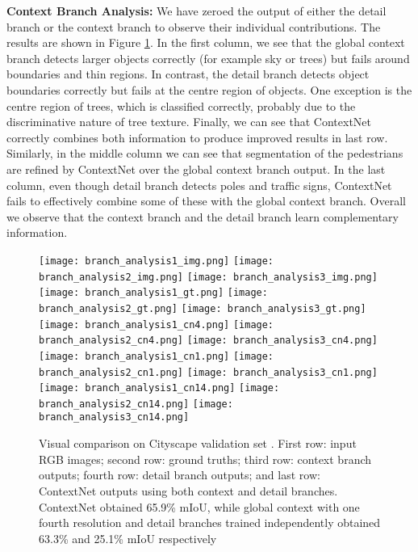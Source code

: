 \documentclass[runningheads]{llncs}
\newcommand{\subsubsubsection}[1]{\vspace{0.2em}\noindent\textbf{\textcolor[rgb]{0,.1,.4}{#1:}}}
\begin{document}
\subsubsubsection{Context Branch Analysis}
We have zeroed the output of either the detail branch or the context branch to observe their individual contributions. The results are shown in Figure \ref{fig:results-cityscapes-viz}. In the first column, we see that the global context branch detects larger objects correctly (for example sky or trees) but fails around boundaries and thin regions. In contrast, the detail branch detects object boundaries correctly but fails at the centre region of objects. One exception is the centre region of trees, which is classified correctly, probably due to the discriminative nature of tree texture. Finally, we can see that ContextNet correctly combines both information to produce improved results in last row. Similarly, in the middle column we can see that segmentation of the pedestrians are refined by ContextNet over the global context branch output. In the last column, even though detail branch detects poles and traffic signs, ContextNet fails to effectively combine some of these with the global context branch. Overall we observe that the context branch and the detail branch learn complementary information.

\begin{figure}[t!]
\begin{center}
    \texttt{[image: branch\_analysis1\_img.png]}
    \texttt{[image: branch\_analysis2\_img.png]}
    \texttt{[image: branch\_analysis3\_img.png]}
    \\
    \texttt{[image: branch\_analysis1\_gt.png]}
    \texttt{[image: branch\_analysis2\_gt.png]}
    \texttt{[image: branch\_analysis3\_gt.png]}
    \\
    \texttt{[image: branch\_analysis1\_cn4.png]}
    \texttt{[image: branch\_analysis2\_cn4.png]}
    \texttt{[image: branch\_analysis3\_cn4.png]}
    \\
    \texttt{[image: branch\_analysis1\_cn1.png]}
    \texttt{[image: branch\_analysis2\_cn1.png]}
    \texttt{[image: branch\_analysis3\_cn1.png]}
    \\
    \texttt{[image: branch\_analysis1\_cn14.png]}
    \texttt{[image: branch\_analysis2\_cn14.png]}
    \texttt{[image: branch\_analysis3\_cn14.png]}
\end{center}
\caption{Visual comparison on Cityscape validation set \cite{cityscaples2016}. First row: input RGB images; second row: ground truths; third row: context branch outputs; fourth row: detail branch outputs; and last row: ContextNet outputs using both context and detail branches. ContextNet obtained 65.9\% mIoU, while global context with one fourth resolution and detail branches trained independently obtained 63.3\% and 25.1\% mIoU respectively}
\label{fig:results-cityscapes-viz}
\end{figure}
\end{document}
